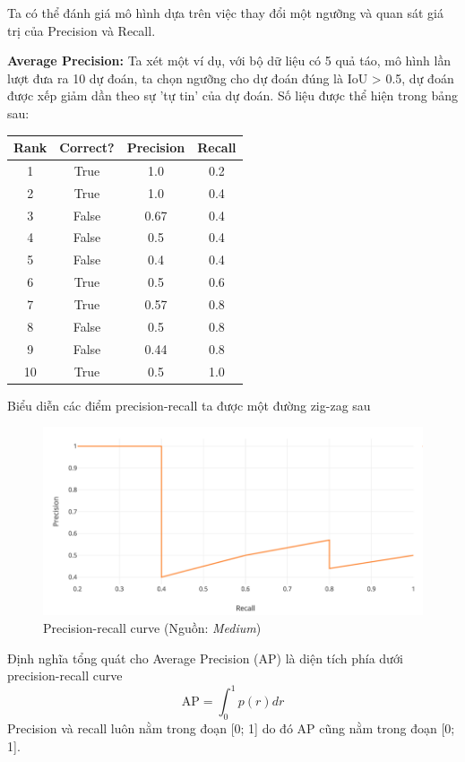 \documentclass[a4paper, 12pt]{report}
\begin{document}
Ta có thể đánh giá mô hình dựa trên việc thay đổi một ngưỡng và quan sát giá trị của Precision và Recall.\par
\textbf{Average Precision:} Ta xét một ví dụ, với bộ dữ liệu có 5 quả táo, mô hình lần lượt đưa ra 10 dự đoán, ta chọn ngưỡng cho dự đoán đúng là IoU > 0.5, dự đoán được xếp giảm dần theo sự 'tự tin' của dự đoán. Số liệu được thể hiện trong bảng sau: \par
	\begin{center}
		\begin{tabular}{||c c c c ||} 
			\hline
			Rank & Correct? & Precision & Recall \\ [0.5ex] 
			\hline\hline
			1 & True & 1.0 & 0.2   \\ 
			\hline
			2 & True & 1.0 & 0.4   \\
			\hline
			3 & False & 0.67 & 0.4 \\
			\hline
			4 & False & 0.5 & 0.4  \\
			\hline
			5 & False & 0.4 & 0.4  \\ 
			\hline
			6 & True & 0.5 & 0.6  \\
			\hline
			7 & True & 0.57 & 0.8  \\
			\hline
			8 & False & 0.5 & 0.8  \\
			\hline
			9 & False & 0.44 & 0.8  \\
			\hline
			10 & True & 0.5 & 1.0 \\
			\hline
		\end{tabular}
	\end{center}
Biểu diễn các điểm precision-recall ta được một đường zig-zag sau\par 
\begin{figure}[!h]
	\centering
	\includegraphics[width=0.7\linewidth]{Images/screensprhot001}
	\caption{Precision-recall curve (Nguồn: \textit{Medium})}
	\label{fig:screensprhot001}
\end{figure}
Định nghĩa tổng quát cho Average Precision (AP) là diện tích phía dưới precision-recall curve 
$$ \text{AP} = \int_{0}^{1}p(r)dr$$
Precision và recall luôn nằm trong đoạn [0; 1] do đó AP cũng nằm trong đoạn [0; 1].  \par
\end{document}
